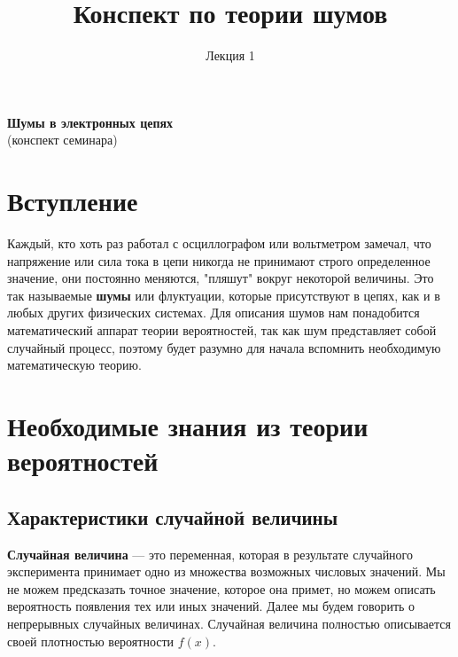 \documentclass[a4paper, 12pt]{article}
\title{Конспект по теории шумов}
\author{Лекция 1}
\date{} %
\begin{document}
\begin{titlepage}
    \vspace*{\fill} %
    \begin{center}
        \Huge \textbf{Шумы в электронных цепях} \\
        \vspace{1cm} %
        \large (конспект семинара)
    \end{center}
    \vspace*{\fill} %
\end{titlepage}
\pagebreak %

\section{Вступление}
Каждый, кто хоть раз работал с осциллографом или вольтметром замечал, что напряжение или сила тока в цепи никогда не принимают строго определенное значение, они постоянно меняются, "пляшут" вокруг некоторой величины. Это так называемые \textbf{шумы} или флуктуации, которые присутствуют в цепях, как и в любых других физических системах. Для описания шумов нам понадобится математический аппарат теории вероятностей, так как шум представляет собой случайный процесс, поэтому будет разумно для начала вспомнить необходимую математическую теорию.

\section{Необходимые знания из теории вероятностей}
\subsection{Характеристики случайной величины}
\textbf{Случайная величина} — это переменная, которая в результате случайного эксперимента принимает одно из множества возможных числовых значений. Мы не можем предсказать точное значение, которое она примет, но можем описать вероятность появления тех или иных значений. Далее мы будем говорить о непрерывных случайных величинах. Случайная величина полностью описывается своей плотностью вероятности $f(x)$.
\end{document}

